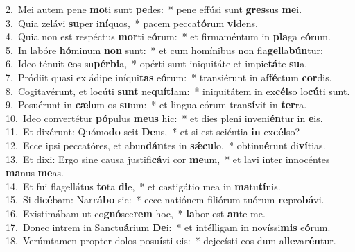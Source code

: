 {2.~}Mei autem pene \textbf{mo}ti sunt \textbf{pe}des:~* pene effúsi sunt \textbf{gres}sus \textbf{me}i.\\
{3.~}Quia zelávi \textbf{su}per i\textbf{ní}quos,~* pacem pecca\textbf{tó}rum \textbf{vi}dens.\\
{4.~}Quia non est respéctus \textbf{mor}ti e\textbf{ó}rum:~* et firmaméntum in \textbf{pla}ga e\textbf{ó}rum.\\
{5.~}In labóre \textbf{hó}minum \textbf{non} sunt:~* et cum homínibus non fla\textbf{gel}la\textbf{bún}tur:\\
{6.~}Ideo ténuit \textbf{e}os su\textbf{pér}\textbf{bi}a,~* opérti sunt iniquitáte et impie\textbf{tá}te \textbf{su}a.\\
{7.~}Pródiit quasi ex ádipe iníqui\textbf{tas} e\textbf{ó}rum:~* transiérunt in af\textbf{fé}ctum \textbf{cor}dis.\\
{8.~}Cogitavérunt, et locúti \textbf{sunt} ne\textbf{quí}\textbf{ti}am:~* iniquitátem in ex\textbf{cél}so lo\textbf{cú}ti sunt.\\
{9.~}Posuérunt in \textbf{cæ}lum os \textbf{su}um:~* et lingua eórum tran\textbf{sí}vit in \textbf{ter}ra.\\
{10.~}Ideo convertétur \textbf{pó}pulus \textbf{me}\textbf{us} hic:~* et dies pleni inveni\textbf{én}tur in \textbf{e}is.\\
{11.~}Et dixérunt: Quómo\textbf{do} scit \textbf{De}us,~* et si est sciéntia \textbf{in} ex\textbf{cél}so?\\
{12.~}Ecce ipsi peccatóres, et abun\textbf{dán}tes in \textbf{sǽ}\textbf{cu}lo,~* obtinu\textbf{é}runt di\textbf{ví}tias.\\
{13.~}Et dixi: Ergo sine causa justifi\textbf{cá}vi cor \textbf{me}um,~* et lavi inter innocéntes \textbf{ma}nus \textbf{me}as.\\
{14.~}Et fui flagellátus \textbf{to}ta \textbf{di}e,~* et castigátio mea in \textbf{ma}tu\textbf{tí}nis.\\
{15.~}Si di\textbf{cé}bam: Nar\textbf{rá}\textbf{bo} sic:~* ecce natiónem filiórum tuórum \textbf{re}pro\textbf{bá}vi.\\
{16.~}Existimábam ut co\textbf{gnó}sce\textbf{rem} hoc,~* \textbf{la}bor est \textbf{an}te me.\\
{17.~}Donec intrem in Sanctu\textbf{á}rium \textbf{De}i:~* et intélligam in novíssi\textbf{mis} e\textbf{ó}rum.\\
{18.~}Verúmtamen propter dolos posu\textbf{í}sti \textbf{e}is:~* dejecísti eos dum al\textbf{le}va\textbf{rén}tur.\\
